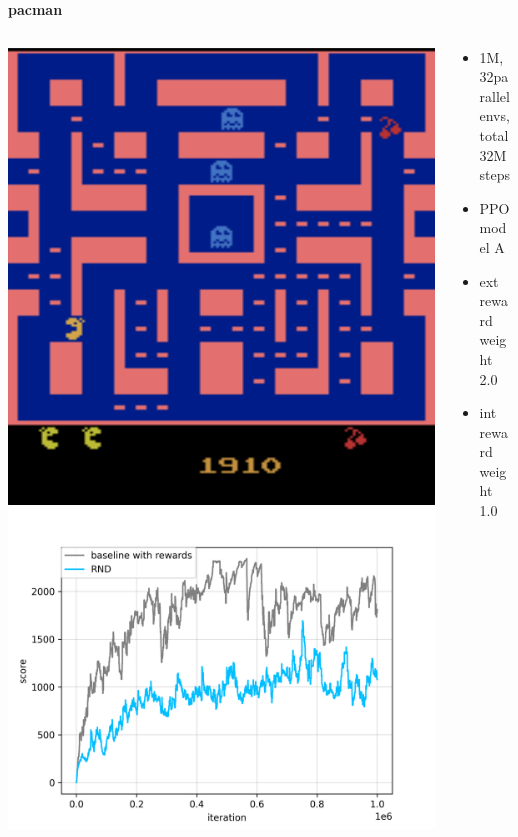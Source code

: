 \documentclass[xcolor=dvipsnames]{beamer}
\begin{document}
\begin{frame}{\bf pacman}
\begin{columns}
      \begin{column}{0.5\textwidth}
        \includegraphics[scale=0.25]{../images/pacman.png}
        \includegraphics[scale=0.3]{../results/pacman_score_per_iteration.png}
      \end{column}

      \begin{column}{0.5\textwidth}
        \begin{itemize}
          \item 1M, 32parallel envs, total 32M steps
          \item PPO model A
          \item ext reward weight 2.0
          \item int reward weight 1.0
        \end{itemize}
      \end{column}

  \end{columns}

\end{frame}
\end{document}
